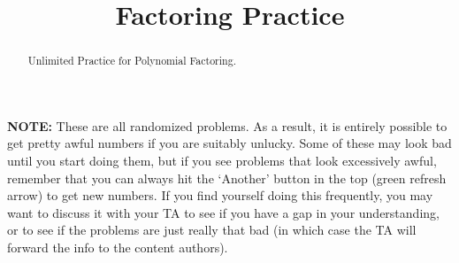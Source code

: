 \documentclass{ximera}
\title{Factoring Practice}
\begin{document}
\begin{abstract}
    Unlimited Practice for Polynomial Factoring.
\end{abstract}
\maketitle

\textbf{NOTE:} These are all randomized problems. As a result, it is entirely possible to get pretty awful numbers if you are suitably unlucky. Some of these may look bad until you start doing them, but if you see problems that look excessively awful, remember that you can always hit the `Another' button in the top (green refresh arrow) to get new numbers. If you find yourself doing this frequently, you may want to discuss it with your TA to see if you have a gap in your understanding, or to see if the problems are just really that bad (in which case the TA will forward the info to the content authors).

%
\end{document}
